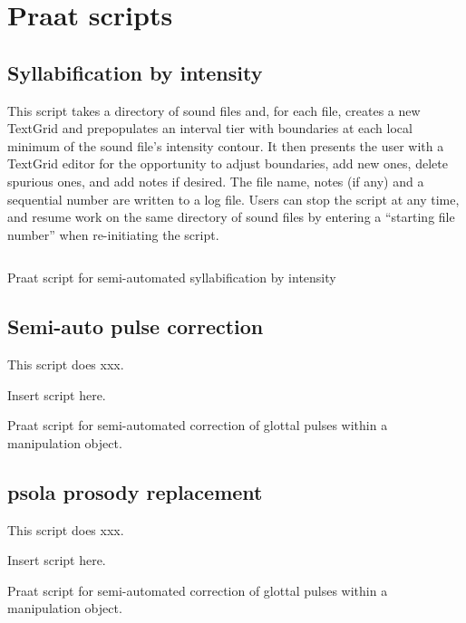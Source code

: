 \chapter{Praat scripts\label{apx:PraatScripts}}

\section{Syllabification by intensity}
This script takes a directory of sound files and, for each file, creates a new TextGrid and prepopulates an interval tier with boundaries at each local minimum of the sound file’s intensity contour.  It then presents the user with a TextGrid editor for the opportunity to adjust boundaries, add new ones, delete spurious ones, and add notes if desired.  The file name, notes (if any) and a sequential number are written to a log file.  Users can stop the script at any time, and resume work on the same directory of sound files by entering a “starting file number” when re-initiating the script.

\begin{code}
	\inputminted[fontsize=\small, tabsize=2]{r}{../scripts/syllByIntens_dissVersion.praat}
	\caption[Syllabification by intensity]{Praat script for semi-automated syllabification by intensity\label{lst:SylInt}}
\end{code}
\newpage

\section{Semi-auto pulse correction}
This script does xxx.

\begin{code}
	Insert script here.
	\caption[Semi-auto pulse correction]{Praat script for semi-automated correction of glottal pulses within a manipulation object.\label{lst:PulseCor}}
\end{code}
\newpage

\section{\ac{psola} prosody replacement}
This script does xxx.

\begin{code}
	Insert script here.
	\caption[Semi-auto pulse correction]{Praat script for semi-automated correction of glottal pulses within a manipulation object.\label{lst:ProsPSOLA}}
\end{code}
